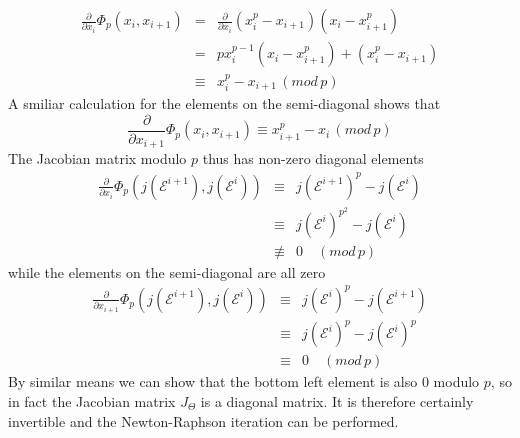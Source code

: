 \begin{eqnarray}
 \frac{\partial}{\partial x_i} \Phi_p(x_i, x_{i+1}) &=& \frac{\partial}{\partial x_i}(x_i^p-x_{i+1})(x_i-x_{i+1}^p)\nonumber \\
						    &=& p x_i^{p-1}(x_i-x_{i+1}^p)+(x_i^p-x_{i+1})\nonumber \\
						    &\equiv& x_i^p-x_{i+1}\, (mod\, p) \nonumber
\end{eqnarray}
A smiliar calculation for the elements on the semi-diagonal shows that
$$ \frac{\partial}{\partial x_{i+1}} \Phi_p(x_i, x_{i+1}) \equiv x_{i+1}^p - x_i \, (mod\,p) $$
The Jacobian matrix modulo $p$ thus has non-zero diagonal elements
\begin{eqnarray}
 \frac{\partial}{\partial x_i} \Phi_p(j(\mathscr{E}^{i+1}), j(\mathscr{E}^i)) &\equiv& j(\mathscr{E}^{i+1})^p-j(\mathscr{E}^i) \nonumber \\
									      &\equiv& j(\mathscr{E}^i)^{p^2}-j(\mathscr{E}^i) \nonumber \\
									      &\not\equiv& 0 \quad (mod\, p) \nonumber
\end{eqnarray}
while the elements on the semi-diagonal are all zero
\begin{eqnarray}
 \frac{\partial}{\partial x_{i+1}} \Phi_p(j(\mathscr{E}^{i+1}), j(\mathscr{E}^i)) &\equiv& j(\mathscr{E}^i)^p-j(\mathscr{E}^{i+1}) \nonumber \\
										  &\equiv& j(\mathscr{E}^i)^p-j(\mathscr{E}^i)^p \nonumber \\
										  &\equiv& 0 \quad (mod\, p) \nonumber
\end{eqnarray}
By similar means we can show that the bottom left element is also $0$ modulo $p$, so in fact the Jacobian matrix
$J_\Theta$ is a diagonal matrix. It is therefore certainly invertible and the Newton-Raphson iteration can be
performed.

